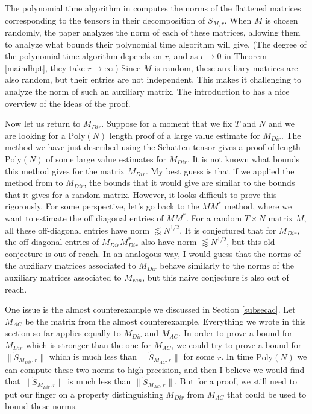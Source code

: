 \documentclass{amsart}
\newcommand{\Poly}{\textrm{Poly}}
\begin{document}
The polynomial time algorithm in \cite{DHPT} computes the norms of the flattened matrices corresponding to the tensors in their decomposition of $S_{M,r}$.  When $M$ is chosen randomly, the paper \cite{DHPT} analyzes the norm of each of these matrices, allowing them to analyze what bounds their polynomial time algorithm will give.  (The degree of the polynomial time algorithm depends on $r$, and as $\epsilon \rightarrow 0$ in Theorem \ref{maindhpt}, they take $r \rightarrow \infty$.)  Since $M$ is random, these auxiliary matrices are also random, but their entries are not independent.  This makes it challenging to analyze the norm of such an auxiliary matrix.  
 The introduction to \cite{DHPT} has a nice overview of the ideas of the proof.

Now let us return to $M_{Dir}$.  Suppose for a moment that we fix $T$ and $N$ and we are looking for a $\Poly(N)$ length proof of a large value estimate for $M_{Dir}$.  The method we have just described using the Schatten tensor gives a proof of length $\Poly(N)$ of some large value estimates for $M_{Dir}$.  It is not known what bounds this method gives for the matrix $M_{Dir}$.  My best guess is that if we applied the method from \cite{DHPT} to $M_{Dir}$, the bounds that it would give are similar to the bounds that it gives for a random matrix.  However, it looks difficult to prove this rigorously.  For some perspective, let's go back to the $M M^*$ method, where we want to estimate the off diagonal entries of $M M^*$.  For a random $T \times N$ matrix $M$, all these off-diagonal entries have norm $\lessapprox N^{1/2}$.  It is conjectured that for $M_{Dir}$, the off-diagonal entries of $M_{Dir} M_{Dir}^*$ also have norm $\lessapprox N^{1/2}$, but this old conjecture is out of reach.  In an analogous way, I would guess that the norms of the auxiliary matrices associated to $M_{Dir}$ behave similarly to the norms of the auxiliary matrices associated to $M_{ran}$, but this naive conjecture is also out of reach.


One issue is the almost counterexample we discussed in Section \ref{subsecac}.  Let $M_{AC}$ be the matrix from the almost counterexample.  Everything we wrote in this section so far applies equally to $M_{Dir}$ and $M_{AC}$.  In order to prove a bound for $M_{Dir}$ which is stronger than the one for $M_{AC}$, we could try to prove a bound for $\| \tilde S_{M_{Dir}, r} \|$ which is much less than $\| \tilde S_{M_{AC}, r} \|$ for some $r$.  In time $\Poly(N)$ we can compute these two norms to high precision, and then I believe we would find that  $\| \tilde S_{M_{Dir}, r} \|$ is much less than $\| \tilde S_{M_{AC}, r} \|$.    But for a proof,  we still need to put our finger on a property distinguishing $M_{Dir}$ from $M_{AC}$ that could be used to bound these norms.  
\end{document}
